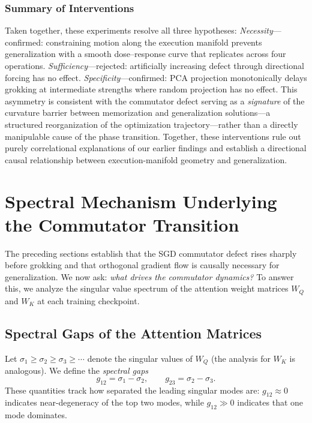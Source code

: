 \documentclass[11pt]{article}
\begin{document}
\subsubsection{Summary of Interventions}
\label{sec:intervention_summary}

Taken together, these experiments resolve all three hypotheses:
\emph{Necessity}---confirmed: constraining motion along the execution manifold prevents generalization with a smooth dose--response curve that replicates across four operations.
\emph{Sufficiency}---rejected: artificially increasing defect through directional forcing has no effect.
\emph{Specificity}---confirmed: PCA projection monotonically delays grokking at intermediate strengths where random projection has no effect.
This asymmetry is consistent with the commutator defect serving as a \emph{signature} of the curvature barrier between memorization and generalization solutions---a structured reorganization of the optimization trajectory---rather than a directly manipulable cause of the phase transition.
Together, these interventions rule out purely correlational explanations of our earlier findings and establish a directional causal relationship between execution-manifold geometry and generalization.


\section{Spectral Mechanism Underlying the Commutator Transition}
\label{sec:spectral}

The preceding sections establish that the SGD commutator defect rises sharply before grokking and that orthogonal gradient flow is causally necessary for generalization.
We now ask: \emph{what drives the commutator dynamics?}
To answer this, we analyze the singular value spectrum of the attention weight matrices $W_Q$ and $W_K$ at each training checkpoint.

\subsection{Spectral Gaps of the Attention Matrices}
\label{sec:spectral_gaps}

Let $\sigma_1 \ge \sigma_2 \ge \sigma_3 \ge \cdots$ denote the singular values of $W_Q$ (the analysis for $W_K$ is analogous).
We define the \emph{spectral gaps}
\begin{equation}
    g_{12} = \sigma_1 - \sigma_2, \qquad g_{23} = \sigma_2 - \sigma_3.
\end{equation}
These quantities track how separated the leading singular modes are: $g_{12} \approx 0$ indicates near-degeneracy of the top two modes, while $g_{12} \gg 0$ indicates that one mode dominates.
\end{document}
